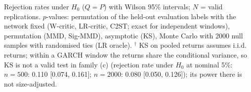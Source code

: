 Rejection rates under $H_0$ ($Q=P$) with Wilson 95\% intervals; $N$ = valid replications.
$p$-values: permutation of the held-out evaluation labels with the network fixed (W-critic, LR-critic, C2ST; exact for independent windows), permutation (MMD, Sig-MMD), asymptotic (KS), Monte Carlo with 2000 null samples with randomised ties (LR oracle).
$^{\dagger}$ KS on pooled returns assumes i.i.d. returns; within a GARCH window the returns share the conditional variance, so KS is not a valid test in family (c) (rejection rate under $H_0$ at nominal 5\%: $n=500$: 0.110 [0.074, 0.161]; $n=2000$: 0.080 [0.050, 0.126]); its power there is not size-adjusted.
